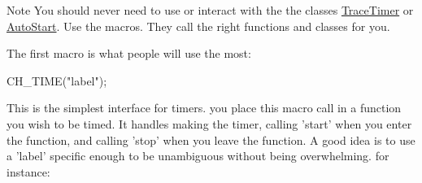\begin{DoxyNote}{Note}
You should never need to use or interact with the the classes \hyperlink{class_trace_timer}{Trace\+Timer} or \hyperlink{class_auto_start}{Auto\+Start}. Use the macros. They call the right functions and classes for you.
\end{DoxyNote}
The first macro is what people will use the most\+: 
\begin{DoxyCode}
CH\_TIME(\textcolor{stringliteral}{"label"});
\end{DoxyCode}
 \begin{DoxyVerb} This is the simplest interface for timers.  you place this macro call in a function
 you wish to be timed.  It handles making the timer, calling 'start' when you
 enter the function, and calling 'stop' when you leave the function.  A good
 idea is to use a 'label' specific enough to be unambiguous without being
 overwhelming.  for instance:
\end{DoxyVerb}



